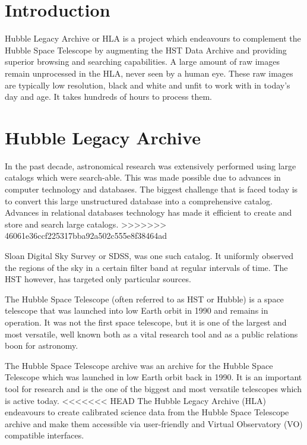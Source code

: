 \documentclass{article}
\begin{document}
	\section{Introduction}
		\hspace*{0.25 in}Hubble Legacy Archive or HLA is a project which endeavours to complement the Hubble Space Telescope by augmenting the HST Data Archive and providing superior browsing and searching capabilities. A large amount of raw images remain unprocessed in the HLA, never seen by a human eye. These raw images are typically low resolution, black and white and unfit to work with in today's day and age. It takes hundreds of hours to process them.
	\section{Hubble Legacy Archive}
		\hspace*{0.25 in}In the past decade, astronomical research was extensively performed using large catalogs which were search-able. This was made possible due to advances in computer technology and databases. The biggest challenge that is faced today is to convert this  large unstructured database into a comprehensive catalog. Advances in relational databases technology has made it efficient to create and store and search large catalogs. 
>>>>>>> 46061e36ccf225317bba92a502c555e8f38464ad

Sloan Digital Sky Survey or SDSS, was one such catalog. It uniformly observed the regions of the sky in a certain filter band at regular intervals of time. The HST however, has targeted only particular sources.

The Hubble Space Telescope (often referred to as HST or Hubble) is a space telescope that was launched into low Earth orbit in 1990 and remains in operation. It was not the first space telescope, but it is one of the largest and most versatile, well known both as a vital research tool and as a public relations boon for astronomy.

The Hubble Space Telescope archive was an archive for the Hubble Space Telescope which was launched in low Earth orbit back in 1990. It is an important tool for research and is the one of the biggest and most versatile telescopes which is active today.
<<<<<<< HEAD
The Hubble Legacy Archive (HLA) endeavours to create calibrated science data from the Hubble Space Telescope archive and make them accessible via user-friendly and Virtual Observatory (VO) compatible interfaces. 
\end{document}
